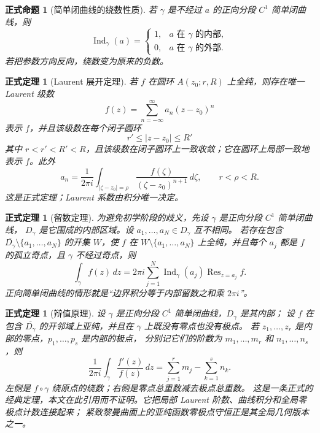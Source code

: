 \documentclass[UTF8,fontset=none,a4paper,11pt]{ctexart}
\theoremstyle{foundation-definition}
\theoremstyle{foundation-theorem}
\newtheorem{theorem}[definition]{正式定理}
\theoremstyle{foundation-proposition}
\newtheorem{proposition}[definition]{正式命题}
\theoremstyle{foundation-example}
\theoremstyle{foundation-remark}
\theoremstyle{foundation-theorem}
\begin{document}
\begin{proposition}[简单闭曲线的绕数性质]\label{prop:winding-number-simple-curve}
若 \(\gamma\) 是不经过 \(a\) 的正向分段 \(C^1\) 简单闭曲线，则
\[
\operatorname{Ind}_{\gamma}(a)=
\begin{cases}
1,&a\text{ 在 }\gamma\text{ 的内部},\\
0,&a\text{ 在 }\gamma\text{ 的外部}.
\end{cases}
\]
若把参数方向反向，绕数变为原来的负数。
\end{proposition}

\begin{theorem}[Laurent 展开定理]\label{thm:laurent-expansion}
若 \(f\) 在圆环 \(A(z_0;r,R)\) 上全纯，则存在唯一 Laurent 级数
\[
f(z)=\sum_{n=-\infty}^{\infty}a_n(z-z_0)^n
\]
表示 \(f\)，并且该级数在每个闭子圆环
\[
r'\leq |z-z_0|\leq R'
\]
其中 \(r<r'<R'<R\)，且该级数在闭子圆环上一致收敛；它在圆环上局部一致地表示 \(f\)。此外
\[
a_n=\frac{1}{2\pi i}
\int_{|\zeta-z_0|=\rho}
\frac{f(\zeta)}{(\zeta-z_0)^{n+1}}\,d\zeta,
\qquad r<\rho<R.
\]
这是正式定理；Laurent 系数由积分唯一决定。
\end{theorem}

\begin{theorem}[留数定理]\label{thm:residue-theorem}
为避免初学阶段的歧义，先设 \(\gamma\) 是正向分段 \(C^1\) 简单闭曲线，
\(D_\gamma\) 是它围成的内部区域。设 \(a_1,\ldots,a_N\in D_\gamma\) 互不相同。
若存在包含 \(\overline{D_\gamma}\setminus\{a_1,\ldots,a_N\}\) 的开集 \(W\)，使
\(f\) 在 \(W\setminus\{a_1,\ldots,a_N\}\) 上全纯，并且每个 \(a_j\) 都是
\(f\) 的孤立奇点，且 \(\gamma\) 不经过奇点，则
\[
\int_{\gamma}f(z)\,dz
=2\pi i\sum_{j=1}^{N}\operatorname{Ind}_{\gamma}(a_j)
\operatorname{Res}_{z=a_j}f.
\]
正向简单闭曲线的情形就是“边界积分等于内部留数之和乘 \(2\pi i\)”。
\end{theorem}

\begin{theorem}[辩值原理]\label{thm:argument-principle}
设 \(\gamma\) 是正向分段 \(C^1\) 简单闭曲线，\(D_\gamma\) 是其内部；
设 \(f\) 在包含 \(\overline{D_\gamma}\) 的开邻域上亚纯，并且在 \(\gamma\) 上既没有零点也没有极点。
若 \(z_1,\ldots,z_r\) 是内部的零点，\(p_1,\ldots,p_s\) 是内部的极点，
分别记它们的阶数为 \(m_1,\ldots,m_r\) 和 \(n_1,\ldots,n_s\)，则
\[
\frac{1}{2\pi i}\int_\gamma \frac{f'(z)}{f(z)}\,dz
=\sum_{j=1}^{r}m_j-\sum_{k=1}^{s}n_k.
\]
左侧是 \(f\circ\gamma\) 绕原点的绕数；右侧是零点总重数减去极点总重数。
这是一条正式的经典定理，本文在此引用而不证明。它把局部 Laurent 阶数、曲线积分和全局零极点计数连接起来；
紧致黎曼曲面上的亚纯函数零极点守恒正是其全局几何版本之一。
\end{theorem}
\end{document}
